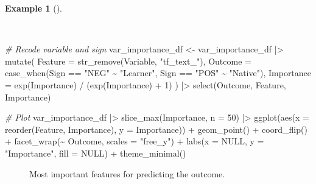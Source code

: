 \documentclass[
  letterpaper,
  DIV=11,
  numbers=noendperiod]{scrreprt}
\newenvironment{Shaded}{\begin{snugshade}}{\end{snugshade}}
\newcommand{\AttributeTok}[1]{\textcolor[rgb]{0.00,0.00,0.00}{#1}}
\newcommand{\CommentTok}[1]{\textcolor[rgb]{0.00,0.00,0.00}{\textit{#1}}}
\newcommand{\ConstantTok}[1]{\textcolor[rgb]{0.00,0.00,0.00}{#1}}
\newcommand{\DecValTok}[1]{\textcolor[rgb]{0.00,0.00,0.00}{#1}}
\newcommand{\FunctionTok}[1]{\textcolor[rgb]{0.00,0.00,0.00}{#1}}
\newcommand{\NormalTok}[1]{\textcolor[rgb]{0.00,0.00,0.00}{#1}}
\newcommand{\OtherTok}[1]{\textcolor[rgb]{0.00,0.00,0.00}{#1}}
\newcommand{\SpecialCharTok}[1]{\textcolor[rgb]{0.00,0.00,0.00}{#1}}
\newcommand{\StringTok}[1]{\textcolor[rgb]{0.00,0.00,0.00}{#1}}
\theoremstyle{definition}
\newtheorem{example}{Example}[chapter]
\theoremstyle{remark}
\begin{document}
\begin{example}[]\protect\hypertarget{exm-pda-class-tune-hyperparameters-evaluate-test-vip-plot}{}\label{exm-pda-class-tune-hyperparameters-evaluate-test-vip-plot}

~

\begin{Shaded}
\begin{Highlighting}[]
\CommentTok{\# Recode variable and sign}
\NormalTok{var\_importance\_df }\OtherTok{\textless{}{-}}
\NormalTok{  var\_importance\_df }\SpecialCharTok{|\textgreater{}}
  \FunctionTok{mutate}\NormalTok{(}
    \AttributeTok{Feature =} \FunctionTok{str\_remove}\NormalTok{(Variable, }\StringTok{"tf\_text\_"}\NormalTok{),}
    \AttributeTok{Outcome =} \FunctionTok{case\_when}\NormalTok{(Sign }\SpecialCharTok{==} \StringTok{"NEG"} \SpecialCharTok{\textasciitilde{}} \StringTok{"Learner"}\NormalTok{, Sign }\SpecialCharTok{==} \StringTok{"POS"} \SpecialCharTok{\textasciitilde{}} \StringTok{"Native"}\NormalTok{),}
    \AttributeTok{Importance =} \FunctionTok{exp}\NormalTok{(Importance) }\SpecialCharTok{/}\NormalTok{ (}\FunctionTok{exp}\NormalTok{(Importance) }\SpecialCharTok{+} \DecValTok{1}\NormalTok{)}
\NormalTok{    ) }\SpecialCharTok{|\textgreater{}}
  \FunctionTok{select}\NormalTok{(Outcome, Feature, Importance)}

\CommentTok{\# Plot}
\NormalTok{var\_importance\_df }\SpecialCharTok{|\textgreater{}}
  \FunctionTok{slice\_max}\NormalTok{(Importance, }\AttributeTok{n =} \DecValTok{50}\NormalTok{) }\SpecialCharTok{|\textgreater{}}
  \FunctionTok{ggplot}\NormalTok{(}\FunctionTok{aes}\NormalTok{(}\AttributeTok{x =} \FunctionTok{reorder}\NormalTok{(Feature, Importance), }\AttributeTok{y =}\NormalTok{ Importance)) }\SpecialCharTok{+}
  \FunctionTok{geom\_point}\NormalTok{() }\SpecialCharTok{+}
  \FunctionTok{coord\_flip}\NormalTok{() }\SpecialCharTok{+}
  \FunctionTok{facet\_wrap}\NormalTok{(}\SpecialCharTok{\textasciitilde{}}\NormalTok{ Outcome, }\AttributeTok{scales =} \StringTok{"free\_y"}\NormalTok{) }\SpecialCharTok{+}
  \FunctionTok{labs}\NormalTok{(}\AttributeTok{x =} \ConstantTok{NULL}\NormalTok{, }\AttributeTok{y =} \StringTok{"Importance"}\NormalTok{, }\AttributeTok{fill =} \ConstantTok{NULL}\NormalTok{) }\SpecialCharTok{+}
  \FunctionTok{theme\_minimal}\NormalTok{()}
\end{Highlighting}
\end{Shaded}

\begin{figure}[H]


\caption{\label{fig-pda-class-tune-hyperparameters-evaluate-test-vip-plot}Most
important features for predicting the outcome.}

\end{figure}%

\end{example}
\end{document}
